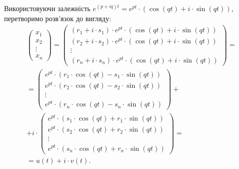 \begin{enumerate}
Використовуючи залежність $e^{(p + i q) t} = e^{pt} \cdot (\cos (qt) + i \cdot \sin(qt))$, перетворимо розв'язок до вигляду:
\begin{multline*}
	\begin{pmatrix} x_1 \\ x_2 \\ \vdots \\ x_n \end{pmatrix} =
	\begin{pmatrix} (r_1 + i \cdot s_1) \cdot e^{p t} \cdot (\cos (qt) + i \cdot \sin(qt)) \\ (r_2 + i \cdot s_2) \cdot e^{p t} \cdot (\cos (qt) + i \cdot \sin(qt)) \\ \vdots \\ (r_n + i \cdot s_n) \cdot e^{p t} \cdot (\cos (qt) + i \cdot \sin(qt)) \end{pmatrix} = \\
	= \begin{pmatrix} e^{p t} \cdot (r_1 \cdot \cos (qt) - s_1 \cdot \sin(qt)) \\ e^{pt} \cdot (r_2 \cdot \cos (qt) - s_2 \cdot \sin(qt)) \\ \vdots \\ e^{pt} \cdot (r_n \cdot \cos (qt) - s_n \cdot \sin(qt)) \end{pmatrix} + \\ + i \cdot \begin{pmatrix} e^{p t} \cdot (s_1 \cdot \cos (qt) + r_1 \cdot \sin(qt)) \\ e^{pt} \cdot (s_2 \cdot \cos (qt) + r_2 \cdot \sin(qt)) \\ \vdots \\ e^{pt} \cdot (s_n \cdot \cos (qt) + r_n \cdot \sin(qt)) \end{pmatrix} = \\
	= u(t) + i \cdot v(t).
\end{multline*}


\end{enumerate}
